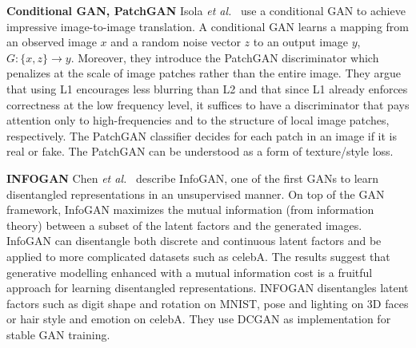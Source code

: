 \documentclass[12pt,a4paper]{article}
\begin{document}
\par \textbf{Conditional GAN, PatchGAN} Isola \textit{et al.}~\cite{CondGAN_PatchGAN} use a conditional GAN to achieve impressive image-to-image translation. A conditional GAN learns a mapping from an observed image $x$ and a random noise vector $z$ to an output image $y$, $G : \{x,z\} \rightarrow y$. Moreover, they introduce the PatchGAN discriminator which penalizes at the scale of image patches rather than the entire image. They argue that using L1 encourages less blurring than L2 and that since L1 already enforces correctness at the low frequency level, it suffices to have a discriminator that pays attention only to high-frequencies and to the structure of local image patches, respectively. The PatchGAN classifier decides for each patch in an image if it is real or fake. The PatchGAN can be understood as a form of texture/style loss.

\par\textbf{INFOGAN} Chen \textit{et al.}~\cite{InfoGAN} describe InfoGAN, one of the first GANs to learn disentangled representations in an unsupervised manner. On top of the GAN framework, InfoGAN maximizes the mutual information (from information theory) between a subset of the latent factors and the generated images. InfoGAN can disentangle both discrete and continuous latent factors and be applied to more complicated datasets such as celebA. The results suggest that generative modelling enhanced with a mutual information cost is a fruitful approach for learning disentangled representations. INFOGAN disentangles latent factors such as digit shape and rotation on MNIST, pose and lighting on 3D faces or hair style and emotion on celebA. They use DCGAN as implementation for stable GAN training. 


\end{document}
